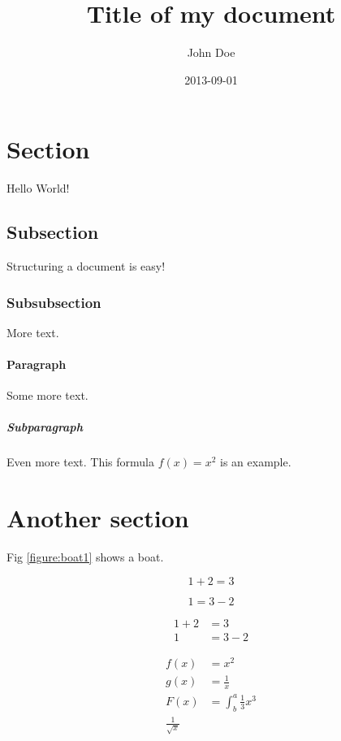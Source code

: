 \documentclass{article}
\title{Title of my document}
\date{2013-09-01}
\author{John Doe}
\begin{document}
\maketitle


\newpage


\section{Section}

Hello World!

\subsection{Subsection}

Structuring a document is easy!

\subsubsection{Subsubsection}

More text.

\paragraph{Paragraph}

Some more text.

\subparagraph{Subparagraph}

Even more text. This formula $f(x) = x^2$ is an example.

\section{Another section}
Fig \ref{figure:boat1} shows a boat.


\begin{equation*}
  1 + 2 = 3
\end{equation*}

\begin{equation*}
  1 = 3 - 2
\end{equation*}

\begin{align*}
  1 + 2 &= 3\\
  1 &= 3 - 2
\end{align*}

\begin{align*}
  f(x) &= x^2\\
  g(x) &= \frac{1}{x}\\
  F(x) &= \int^a_b \frac{1}{3}x^3\\
  \frac{1}{\sqrt{x}}
\end{align*}
\end{document}
